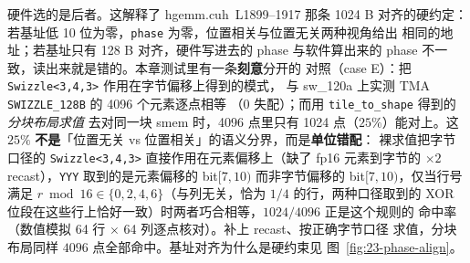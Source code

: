 硬件选的是后者。这解释了 hgemm.cuh~L1899--1917 那条 1024 B 对齐的硬约定：
若基址低 10 位为零，\texttt{phase} 为零，位置相关与位置无关两种视角给出
相同的地址；若基址只有 128 B 对齐，硬件写进去的 phase 与软件算出来的
phase 不一致，读出来就是错的。本章测试里有一条\textbf{刻意}分开的
对照（case E）：把 \texttt{Swizzle\allowbreak{}<3,\allowbreak{}4,\allowbreak{}3>} 作用在字节偏移上得到的模式，
与 sw\_120a 上实测 TMA \texttt{SWIZZLE\_\allowbreak{}128\allowbreak{}B} 的 4096 个元素逐点相等
（$0$ 失配）；而用 \texttt{tile\_\allowbreak{}to\_\allowbreak{}shape} 得到的\emph{分块布局求值}
去对同一块 smem 时，4096 点里只有 1024 点（$25\%$）能对上。这 $25\%$
\textbf{不是}「位置无关 vs 位置相关」的语义分界，而是\textbf{单位错配}：
裸求值把字节口径的 \texttt{Swizzle\allowbreak{}<3,\allowbreak{}4,\allowbreak{}3>} 直接作用在元素偏移上（缺了
fp16 元素到字节的 $\times2$ recast），\texttt{YYY} 取到的是元素偏移的
bit$[7,10)$ 而非字节偏移的 bit$[7,10)$，仅当行号满足
$r\bmod 16\in\{0,2,4,6\}$（与列无关，恰为 $1/4$ 的行，两种口径取到的
XOR 位段在这些行上恰好一致）时两者巧合相等，$1024/4096$ 正是这个规则的
命中率（数值模拟 64 行 $\times$ 64 列逐点核对）。补上 recast、按正确字节口径
求值，分块布局同样 $4096$ 点全部命中。基址对齐为什么是硬约束见
图~\ref{fig:23-phase-align}。

